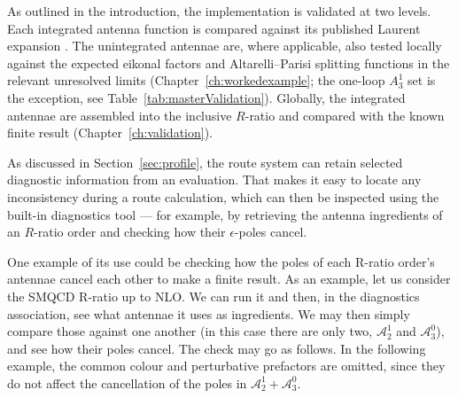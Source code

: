 As outlined in the introduction, the implementation is validated at two levels. Each integrated antenna function is compared against its published Laurent expansion \cite{Gehrmann-DeRidder:2005btv,Gehrmann-DeRidder:2004ttg}. The unintegrated antennae are, where applicable, also tested locally against the expected eikonal factors and Altarelli--Parisi splitting functions in the relevant unresolved limits (Chapter~\ref{ch:workedexample}; the one-loop $A_3^1$ set is the exception, see Table~\ref{tab:masterValidation}). Globally, the integrated antennae are assembled into
the inclusive $R$-ratio and compared with the known finite result
(Chapter~\ref{ch:validation}).

As discussed in Section~\ref{sec:profile}, the route system can retain selected diagnostic
information from an evaluation. That makes it easy to locate any inconsistency during a route
calculation, which can then be inspected using the built-in diagnostics tool --- for example,
by retrieving the antenna ingredients of an $R$-ratio order and checking how their
$\epsilon$-poles cancel.

\iffalse
One example of its use could be checking how the poles of
each R-ratio order's antennae cancel each other to make a finite result. As an
example, let us consider the SMQCD R-ratio up to NLO. We can run it and then,
in the diagnostics association, see what antennae it uses as ingredients. We may
then simply compare those against one another (in this case there are only two,
$\mathcal A_2^1$ and $\mathcal A_3^0$), and see how their poles cancel. The
check may go as follows. In the following example, the common colour and perturbative
prefactors are omitted, since they do not affect the cancellation of the poles in
$\mathcal A_2^1 + \mathcal A_3^0$.

